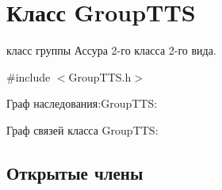 \hypertarget{class_group_t_t_s}{
\section{Класс GroupTTS}
\label{class_group_t_t_s}
}


класс группы Ассура 2-\/го класса 2-\/го вида.  




{\ttfamily \#include $<$GroupTTS.h$>$}



Граф наследования:GroupTTS:


Граф связей класса GroupTTS:
\subsection*{Открытые члены}
